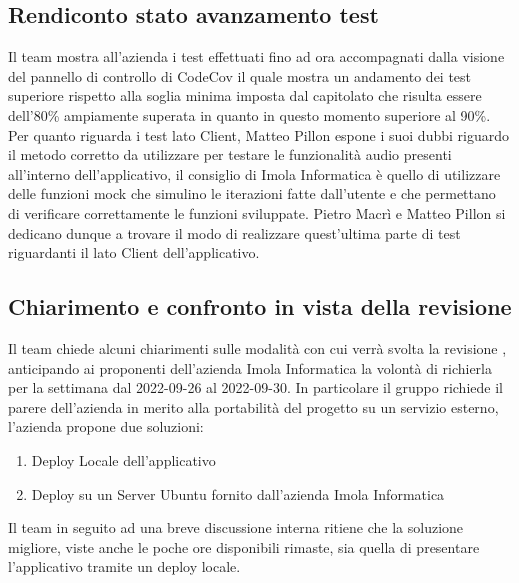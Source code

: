 \subsection{Rendiconto stato avanzamento test}
Il team mostra all'azienda i test effettuati fino ad ora accompagnati dalla visione del pannello di controllo di CodeCov il quale mostra un andamento dei test superiore rispetto alla soglia minima imposta dal capitolato che risulta essere dell'80\% ampiamente superata in quanto in questo momento superiore al 90\%. \newline Per quanto riguarda i test lato Client, Matteo Pillon espone i suoi dubbi riguardo il metodo corretto da utilizzare per testare le funzionalità audio presenti all'interno dell'applicativo, il consiglio di Imola Informatica è quello di utilizzare delle funzioni mock che simulino le iterazioni fatte dall'utente e che permettano di verificare correttamente le funzioni sviluppate. 
Pietro Macrì e Matteo Pillon si dedicano dunque a trovare il modo di realizzare quest'ultima parte di test riguardanti il lato Client dell'applicativo.  

\subsection{Chiarimento e confronto in vista della revisione }
Il team chiede alcuni chiarimenti sulle modalità con cui verrà svolta la revisione , anticipando ai proponenti dell'azienda Imola Informatica la volontà di richierla per la settimana dal 2022-09-26 al 2022-09-30. 
\newline 
In particolare il gruppo richiede il parere dell'azienda in merito alla portabilità del progetto su un servizio esterno, l'azienda propone due soluzioni:
\begin{enumerate}
    \item Deploy Locale dell'applicativo
    \item Deploy su un Server Ubuntu fornito dall'azienda Imola Informatica 
\end{enumerate}
Il team in seguito ad una breve discussione interna ritiene che la soluzione migliore, viste anche le poche ore disponibili rimaste, sia quella di presentare l'applicativo tramite un deploy locale. 